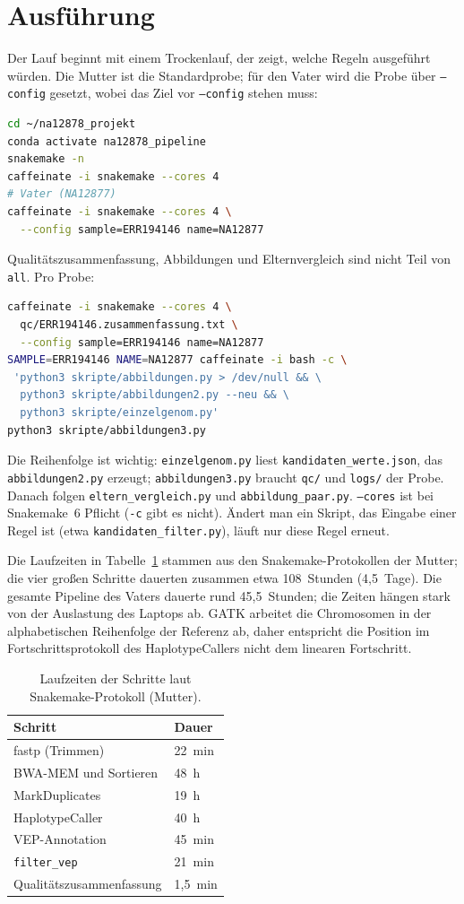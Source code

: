 \documentclass[10pt,a4paper,twocolumn]{article}
\begin{document}
\section{Ausführung}\label{sec:lauf}
Der Lauf beginnt mit einem Trockenlauf, der zeigt, welche Regeln ausgeführt würden. Die Mutter ist die Standardprobe; für den Vater wird die Probe über \texttt{--config} gesetzt, wobei das Ziel vor \texttt{--config} stehen muss:
\begin{lstlisting}[language=bash]
cd ~/na12878_projekt
conda activate na12878_pipeline
snakemake -n
caffeinate -i snakemake --cores 4
# Vater (NA12877)
caffeinate -i snakemake --cores 4 \
  --config sample=ERR194146 name=NA12877
\end{lstlisting}
Qualitätszusammenfassung, Abbildungen und Elternvergleich sind nicht Teil von \texttt{all}. Pro Probe:
\begin{lstlisting}[language=bash]
caffeinate -i snakemake --cores 4 \
  qc/ERR194146.zusammenfassung.txt \
  --config sample=ERR194146 name=NA12877
SAMPLE=ERR194146 NAME=NA12877 caffeinate -i bash -c \
 'python3 skripte/abbildungen.py > /dev/null && \
  python3 skripte/abbildungen2.py --neu && \
  python3 skripte/einzelgenom.py'
python3 skripte/abbildungen3.py
\end{lstlisting}
Die Reihenfolge ist wichtig: \texttt{einzelgenom.py} liest \texttt{kandidaten\_werte.json}, das \texttt{abbildungen2.py} erzeugt; \texttt{abbildungen3.py} braucht \texttt{qc/} und \texttt{logs/} der Probe. Danach folgen \texttt{eltern\_vergleich.py} und \texttt{abbildung\_paar.py}. \texttt{--cores} ist bei Snakemake~6 Pflicht (\texttt{-c} gibt es nicht). Ändert man ein Skript, das Eingabe einer Regel ist (etwa \texttt{kandidaten\_filter.py}), läuft nur diese Regel erneut.
 
Die Laufzeiten in Tabelle~\ref{tab:zeit} stammen aus den Snakemake-Protokollen der Mutter; die vier großen Schritte dauerten zusammen etwa 108~Stunden (4,5~Tage). Die gesamte Pipeline des Vaters dauerte rund 45,5~Stunden; die Zeiten hängen stark von der Auslastung des Laptops ab. GATK arbeitet die Chromosomen in der alphabetischen Reihenfolge der Referenz ab, daher entspricht die Position im Fortschrittsprotokoll des HaplotypeCallers nicht dem linearen Fortschritt.
 
\begin{table}[t]
\centering\small
\caption{Laufzeiten der Schritte laut Snakemake-Protokoll (Mutter).}
\label{tab:zeit}
\begin{tabular}{@{}p{4.6cm}p{2.4cm}@{}}
\toprule
Schritt & Dauer\\
\midrule
fastp (Trimmen) & 22~min\\
BWA-MEM und Sortieren & 48~h\\
MarkDuplicates & 19~h\\
HaplotypeCaller & 40~h\\
VEP-Annotation & 45~min\\
\texttt{filter\_vep} & 21~min\\
Qualitätszusammenfassung & 1,5~min\\
\bottomrule
\end{tabular}
\end{table}
 
\end{document}

